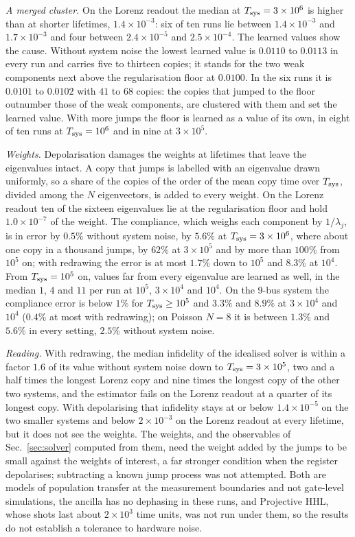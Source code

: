 \documentclass[journal]{IEEEtran}
\begin{document}
\emph{A merged cluster.} On the Lorenz readout the median at $T_{\rm sys}=3\times10^6$ is higher than at shorter lifetimes, $1.4\times10^{-3}$: six of ten runs lie between $1.4\times10^{-3}$ and $1.7\times10^{-3}$ and four between $2.4\times10^{-5}$ and $2.5\times10^{-4}$. The learned values show the cause. Without system noise the lowest learned value is $0.0110$ to $0.0113$ in every run and carries five to thirteen copies; it stands for the two weak components next above the regularisation floor at $0.0100$. In the six runs it is $0.0101$ to $0.0102$ with $41$ to $68$ copies: the copies that jumped to the floor outnumber those of the weak components, are clustered with them and set the learned value. With more jumps the floor is learned as a value of its own, in eight of ten runs at $T_{\rm sys}=10^6$ and in nine at $3\times10^5$.

\emph{Weights.} Depolarisation damages the weights at lifetimes that leave the eigenvalues intact. A copy that jumps is labelled with an eigenvalue drawn uniformly, so a share of the copies of the order of the mean copy time over $T_{\rm sys}$, divided among the $N$ eigenvectors, is added to every weight. On the Lorenz readout ten of the sixteen eigenvalues lie at the regularisation floor and hold $1.0\times10^{-7}$ of the weight. The compliance, which weighs each component by $1/\lambda_j$, is in error by $0.5\%$ without system noise, by $5.6\%$ at $T_{\rm sys}=3\times10^6$, where about one copy in a thousand jumps, by $62\%$ at $3\times10^5$ and by more than $100\%$ from $10^5$ on; with redrawing the error is at most $1.7\%$ down to $10^5$ and $8.3\%$ at $10^4$. From $T_{\rm sys}=10^5$ on, values far from every eigenvalue are learned as well, in the median $1$, $4$ and $11$ per run at $10^5$, $3\times10^4$ and $10^4$. On the 9-bus system the compliance error is below $1\%$ for $T_{\rm sys}\ge10^5$ and $3.3\%$ and $8.9\%$ at $3\times10^4$ and $10^4$ ($0.4\%$ at most with redrawing); on Poisson $N=8$ it is between $1.3\%$ and $5.6\%$ in every setting, $2.5\%$ without system noise.

\emph{Reading.} With redrawing, the median infidelity of the idealised solver is within a factor $1.6$ of its value without system noise down to $T_{\rm sys}=3\times10^5$, two and a half times the longest Lorenz copy and nine times the longest copy of the other two systems, and the estimator fails on the Lorenz readout at a quarter of its longest copy. With depolarising that infidelity stays at or below $1.4\times10^{-5}$ on the two smaller systems and below $2\times10^{-3}$ on the Lorenz readout at every lifetime, but it does not see the weights. The weights, and the observables of Sec.~\ref{sec:solver} computed from them, need the weight added by the jumps to be small against the weights of interest, a far stronger condition when the register depolarises; subtracting a known jump process was not attempted. Both are models of population transfer at the measurement boundaries and not gate-level simulations, the ancilla has no dephasing in these runs, and Projective HHL, whose shots last about $2\times10^3$ time units, was not run under them, so the results do not establish a tolerance to hardware noise.
\end{document}
